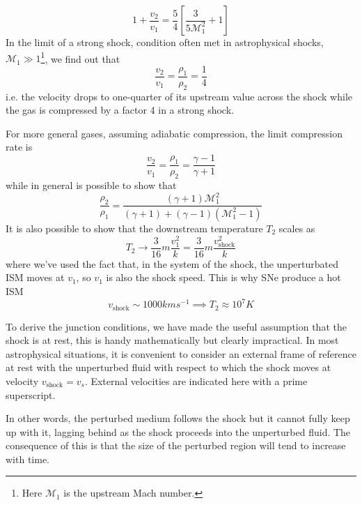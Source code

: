 \begin{equation*}
    1+\frac{v_{2}}{v_{1}} = \frac{5}{4}\left[\frac{3}{5\mathcal{M}_{1}^{2}}+1\right]
\end{equation*}
In the limit of a strong shock, condition often met in astrophysical shocks, $\mathcal{M}_{1} \gg 1$\footnote{Here $\mathcal{M}_{1}$ is the upstream Mach number.}, we find out that 
\begin{equation*}
    \frac{v_{2}}{v_{1}} = \frac{\rho_{1}}{\rho_{2}} = \frac{1}{4}
\end{equation*}
i.e. the velocity drops to one-quarter of its upstream value across the shock while the gas is compressed by a factor 4 in a strong shock.
\par For more general gases, assuming adiabatic compression, the limit compression rate is 
\begin{equation*}
    \frac{v_{2}}{v_{1}} = \frac{\rho_{1}}{\rho_{2}} = \frac{\gamma -1}{\gamma +1}
\end{equation*}
while in general is possible to show that 
\begin{equation*}
    \frac{\rho_{2}}{\rho_{1}} = \frac{(\gamma+1)\mathcal{M}_{1}^{2}}{(\gamma+1)+(\gamma-1)(\mathcal{M}_{1}^{2}-1)}
\end{equation*}
It is also possible to show that the downstream temperature $T_{2}$ scales as 
\begin{equation*}
    T_{2} \to \frac{3}{16}m\frac{v_{1}^{2}}{k} = \frac{3}{16}m\frac{v_{\text{shock}}^{2}}{k}
\end{equation*}
where we've used the fact that, in the system of the shock, the unperturbated ISM moves at $v_{1}$, so $v_{1}$ is also the shock speed. This is why SNe produce a hot ISM
\begin{equation*}
    v_{\text{shock}} \sim 1000\unit{km}\unit{s}^{-1}\implies T_{2}\approx 10^{7}\unit{K}
\end{equation*}
\par To derive the junction conditions, we have made the useful assumption that the shock is at rest, this is handy mathematically but clearly impractical. In most astrophysical situations, it is convenient to consider an external frame of reference at rest with the unperturbed fluid with respect to which the shock moves at velocity $v_{\text{shock}} = v_{s}$. External velocities are indicated here with a prime superscript.
\par In other words, the perturbed medium follows the shock but it cannot fully keep up with it, lagging behind as the shock proceeds into the unperturbed fluid. The consequence of this is that the size of the perturbed region will tend to increase with time.
